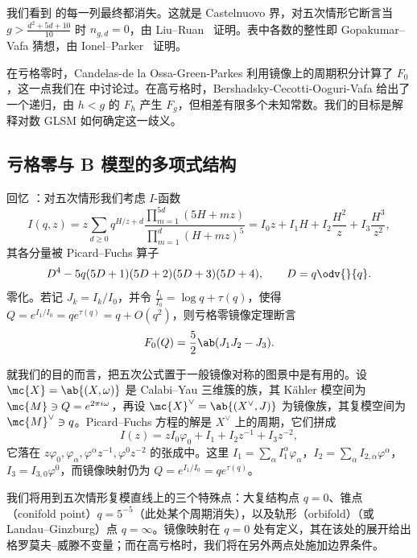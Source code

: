 我们看到  的每一列最终都消失。这就是 Castelnuovo 界，对五次情形它断言当 \(g > \frac{d^2+5d+10}{10}\) 时 \(n_{g,d} = 0\)，由 Liu--Ruan~\cite{LiuRuanCastelnuovo} 证明。表中各数的整性即 Gopakumar–Vafa 猜想，由 Ionel--Parker~\cite{IonelParker2018} 证明。

在亏格零时，Candelas-de la Ossa-Green-Parkes 利用镜像上的周期积分计算了 \(F_0\)，这一点我们在  中讨论过。在高亏格时，Bershadsky-Cecotti-Ooguri-Vafa 给出了一个递归，由 \(h < g\) 的 \(F_h\) 产生 \(F_g\)，但相差有限多个未知常数。我们的目标是解释对数 GLSM 如何确定这一歧义。

\subsection{亏格零与 B 模型的多项式结构}%
\label{sub:Genus zero and the polynomial structure of the B-model}

回忆 ：对五次情形我们考虑 \(I\)-函数
\[
    I(q,z) = z\sum_{d \geq 0} q^{H/z+d} \frac{\prod_{m=1}^{5d}(5H+mz)}{\prod_{m=1}^d (H+mz)^5} = I_0 z + I_1 H + I_2 \frac{H^2}{z} + I_3 \frac{H^3}{z^2},
\]
其各分量被 Picard–Fuchs 算子
\[ D^4 - 5q(5D+1)(5D+2)(5D+3)(5D+4), \qquad D = q \odv{}{q}. \]
零化。若记 \(J_k = I_k/I_0\)，并令 \(\frac{I_1}{I_0} = \log q + \tau(q)\)，使得 \(Q = e^{I_1/I_0} = qe^{\tau(q)} = q + O(q^2)\)，则亏格零镜像定理断言
\[ F_0(Q) = \frac{5}{2}\ab(J_1 J_2 - J_3). \]

就我们的目的而言，把五次公式置于一般镜像对称的图景中是有用的。设 \(\mc{X} = \ab\{(X,\omega)\}\) 是 Calabi–Yau 三维簇的族，其 Kähler 模空间为 \(\mc{M} \ni Q = e^{2\pi i \omega}\)，再设 \(\mc{X}^{\vee} = \ab\{(X^{\vee},J)\}\) 为镜像族，其复模空间为 \(\mc{M}^{\vee} \ni q\)。Picard–Fuchs 方程的解是 \(X^{\vee}\) 上的周期，它们拼成
\[ I(z) = zI_0\varphi_0 + I_1 + I_2 z^{-1} + I_3 z^{-2}, \]
它落在 \(z\varphi_0, \varphi_{\alpha}, \varphi^{\alpha}z^{-1}, \varphi^0 z^{-2}\) 的张成中。这里 \(I_1 = \sum_{\alpha} I_1^{\alpha}\varphi_{\alpha}\)，\(I_2 = \sum_{\alpha} I_{2,\alpha}\varphi^{\alpha}\)，\(I_3 = I_{3,0}\varphi^0\)，而镜像映射仍为 \(Q = e^{I_1/I_0} = qe^{\tau(q)}\)。

我们将用到五次情形复模直线上的三个特殊点：大复结构点 \(q=0\)、锥点（conifold point）\(q = 5^{-5}\)（此处某个周期消失），以及轨形（orbifold）（或 Landau–Ginzburg）点 \(q = \infty\)。镜像映射在 \(q=0\) 处有定义，其在该处的展开给出格罗莫夫–威滕不变量；而在高亏格时，我们将在另外两点处施加边界条件。

